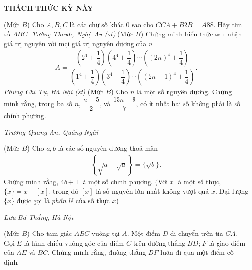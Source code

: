 \begin{center}
	\vspace*{-5pt}
	\textbf{\color{thachthuctoanhoc}THÁCH THỨC KỲ NÀY}
	\vspace*{-5pt}
\end{center}
\begin{multicols}{2}
	\setlength{\abovedisplayskip}{4pt}
	\setlength{\belowdisplayskip}{4pt}
	{}
	(Mức $B$) Cho $A,B,C$ là các chữ số khác $0$ sao cho $\overline{CCA}+\overline{B2B}=\overline{A88}$. Hãy tìm số $\overline{ABC}$. 
	\vskip 0.05cm
	\hfill	\textit{Tường Thanh, Nghệ An (st)}
	\vskip 0.05cm
	{}
	(Mức $B$) Chứng minh biểu thức sau nhận giá trị nguyên với mọi giá trị nguyên dương của $n$
	\begin{align*}
		A\!=\!\dfrac{\left(2^4\!+\!\dfrac14\right)\!\left(4^4\!+\!\dfrac14\right)\!\cdots\! \left((2n)^4\!+\!\dfrac14\right)}{\left(1^4\!+\!\dfrac14\right)\left(3^4\!+\!\dfrac14\right)\!\cdots\! \left((2n\!-\!1)^4\!+\!\dfrac14\right)}.
	\end{align*}
	\vskip 0.05cm
	\hfill	\textit{Phùng Chí Tự, Hà Nội (st)}
	\vskip 0.05cm
	{}
	(Mức $B$) Cho $n$ là một số nguyên dương. Chứng minh rằng, trong ba số $n$,  $\dfrac{n-5}2$, và $\dfrac{15n-9}7$, có ít nhất hai số không phải là số chính phương.
	\begin{flushright}
		\textit{Trương Quang An, Quảng Ngãi}
	\end{flushright}
	{}
	(Mức $B$) Cho $a,b$ là các số nguyên dương thoả mãn
	\begin{align*}
		\left\{ \sqrt{a+\sqrt{a}}\right\}=\{\sqrt b\}.
	\end{align*}
	Chứng minh rằng, $4b+1$ là một số chính phương.
	\vskip 0.05cm
	(Với $x$ là một số thực, $\{x\}=x-[x]$, trong đó $[x]$ là số nguyên lớn nhất không vượt quá $x$. Đại lượng $\{x\}$ được gọi là {\it phần lẻ} của số thực $x$)
	\begin{flushright}
		\textit{Lưu Bá Thắng, Hà Nội}
	\end{flushright}
	{}
	(Mức $B$) Cho tam giác $ABC$ vuông tại $A$. Một điểm $D$ di chuyển trên tia $CA$. Gọi $E$ là hình chiếu vuông góc của điểm $C$ trên đường thẳng $BD$; $F$ là giao điểm của $AE$ và $BC$. Chứng minh rằng, đường thẳng $DF$ luôn đi qua một điểm cố định.
	\begin{figure}[H]

\end{figure}
\end{multicols}
